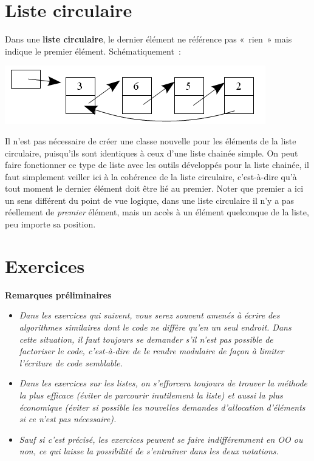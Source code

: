 \section{Liste circulaire}

	Dans une \textbf{liste circulaire}, le dernier élément ne référence 
	pas «~rien~» mais indique le premier élément.
	Schématiquement~:

	\begin{center}
	\includegraphics[width=11.351cm,height=2.54cm]{image/a2012Logique2eme-img009.png}
	\end{center}
	
	Il n'est pas nécessaire de créer une classe nouvelle pour les 
	éléments de la liste circulaire, puisqu'ils sont
	identiques à ceux d'une liste chainée simple. On peut faire fonctionner 
	ce type de liste avec les outils développés
	pour la liste chainée, il faut simplement veiller ici à la cohérence 
	de la liste circulaire, c'est-à-dire qu'à tout
	moment le dernier élément doit être lié au premier. Noter que premier 
	a ici un sens différent du point de vue logique,
	dans une liste circulaire il n'y a pas réellement de \textit{premier} 
	élément, mais un accès à un élément quelconque de
	la liste, peu importe sa position.
	
	
\section{Exercices}

	{\bfseries
	Remarques préliminaires}

	\begin{itemize}
		\item 
			\textit{Dans les exercices qui suivent, vous serez souvent amenés à 
			écrire des algorithmes similaires dont le code ne diffère
			qu'en un seul endroit. Dans cette situation, il faut toujours se 
			demander s'il n'est pas possible de factoriser le
			code, c'est-à-dire de le rendre modulaire de façon à limiter 
			l'écriture de code semblable.}
		\item
			\textit{Dans les exercices sur les listes, on s'efforcera toujours 
			de trouver la méthode la plus efficace (éviter de parcourir
			inutilement la liste) et aussi la plus économique (éviter si possible 
			les nouvelles demandes d'allocation d'éléments si
			ce n'est pas nécessaire).}
		\item 
			\textit{Sauf si c'est précisé, les exercices peuvent se faire 
			indifféremment en OO ou non, ce qui laisse la possibilité de
			s'entraîner dans les deux notations.}
	\end{itemize}
	
